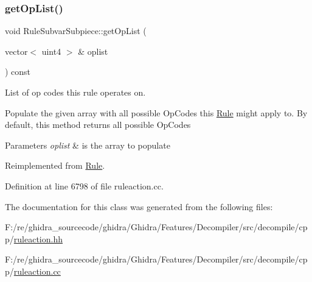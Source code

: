 \subsubsection{\texorpdfstring{getOpList()}{getOpList()}}
{\footnotesize\ttfamily void Rule\+Subvar\+Subpiece\+::get\+Op\+List (\begin{DoxyParamCaption}\item[{vector$<$ uint4 $>$ \&}]{oplist }\end{DoxyParamCaption}) const\hspace{0.3cm}{\ttfamily [virtual]}}



List of op codes this rule operates on. 

Populate the given array with all possible Op\+Codes this \mbox{\hyperlink{class_rule}{Rule}} might apply to. By default, this method returns all possible Op\+Codes 
\begin{DoxyParams}{Parameters}
{\em oplist} & is the array to populate \\
\hline
\end{DoxyParams}


Reimplemented from \mbox{\hyperlink{class_rule_a4023bfc7825de0ab866790551856d10e}{Rule}}.



Definition at line 6798 of file ruleaction.\+cc.



The documentation for this class was generated from the following files\+:\begin{DoxyCompactItemize}
\item 
F\+:/re/ghidra\+\_\+sourcecode/ghidra/\+Ghidra/\+Features/\+Decompiler/src/decompile/cpp/\mbox{\hyperlink{ruleaction_8hh}{ruleaction.\+hh}}\item 
F\+:/re/ghidra\+\_\+sourcecode/ghidra/\+Ghidra/\+Features/\+Decompiler/src/decompile/cpp/\mbox{\hyperlink{ruleaction_8cc}{ruleaction.\+cc}}\end{DoxyCompactItemize}
